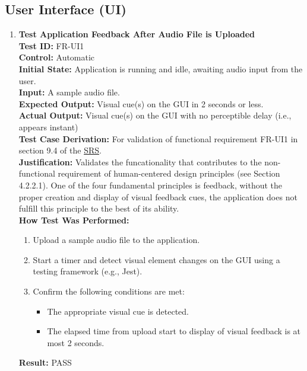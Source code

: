 \documentclass[12pt, titlepage]{article}
\begin{document}
  \subsection{User Interface (UI)}
  \begin{enumerate}
    \item \textbf{Test Application Feedback After Audio File is Uploaded} \\
      \newline
      \textbf{Test ID:} FR-UI1 \\
      \textbf{Control:} Automatic \\
      \textbf{Initial State:} Application is running and idle, awaiting audio input from the user. \\
      \textbf{Input:} A sample audio file. \\
      \textbf{Expected Output:} Visual cue(s) on the GUI in 2 seconds or less. \\
      \textbf{Actual Output:} Visual cue(s) on the GUI with no perceptible delay (i.e., appears instant) \\
      \textbf{Test Case Derivation:} For validation of functional requirement FR-UI1 in section 9.4 of the 
      \href{https://github.com/emilyperica/ScoreGen/blob/main/docs/SRS-Volere/SRS.pdf}{SRS}. \\
      \textbf{Justification:} Validates the funcationality that contributes to the non-functional requirement of
      human-centered design principles (see Section 4.2.2.1). One of the four fundamental principles is feedback, without 
      the proper creation and display of visual feedback cues, the application does not fulfill this principle to the 
      best of its ability.\\
      \textbf{How Test Was Performed:}
      \begin{enumerate}
          \item Upload a sample audio file to the application.
          \item Start a timer and detect visual element changes on the GUI using a testing framework (e.g., Jest).
          \item Confirm the following conditions are met:
          \begin{itemize}
              \item The appropriate visual cue is detected.
              \item The elapsed time from upload start to display of visual feedback is at most 2 seconds.
          \end{itemize}
      \end{enumerate}
      \textbf{Result:} PASS
    

\end{enumerate}
\end{document}
